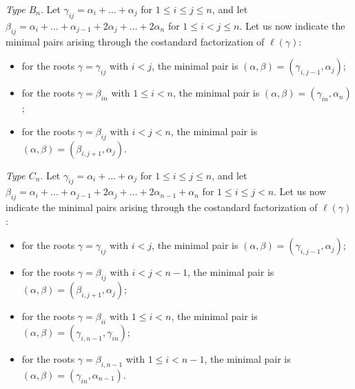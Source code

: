\documentclass[pdftex]{sigma}
\numberwithin{equation}{section}
\begin{document}
\emph{Type $B_n$}.
Let $\gamma_{ij} = \alpha_{i} + \dots + \alpha_{j}$ for $1 \le i \le j \le n$, and let $\beta_{ij} = \alpha_{i} + \dots + \alpha_{j-1} + 2\alpha_{j} + \dots + 2\alpha_{n}$ for $1 \le i < j \le n$. Let us now indicate the minimal pairs arising through the costandard factorization of $\ell(\gamma)$:
\begin{itemize}\itemsep=0pt
\item
for the roots $\gamma=\gamma_{ij}$ with $i < j$, the minimal pair is $(\alpha,\beta)=(\gamma_{i,j - 1},\alpha_{j})$;

\item
for the roots $\gamma=\beta_{in}$ with $1\leq i<n$, the minimal pair is $(\alpha,\beta)=(\gamma_{in},\alpha_{n})$;

\item
for the roots $\gamma=\beta_{ij}$ with $i < j < n$, the minimal pair is $(\alpha,\beta)=(\beta_{i,j + 1},\alpha_{j})$.
\end{itemize}


\emph{Type $C_n$}.
Let $\gamma_{ij} = \alpha_{i} + \dots + \alpha_{j}$ for $1 \le i \le j \le n$, and let $\beta_{ij} = \alpha_{i} + \dots + \alpha_{j - 1} + 2\alpha_{j} + \dots + 2\alpha_{n-1} + \alpha_{n}$ for $1 \le i \le j<n$. Let us now indicate the minimal pairs arising through the costandard factorization of $\ell(\gamma)$:
\begin{itemize}\itemsep=0pt
\item
for the roots $\gamma=\gamma_{ij}$ with $i<j$, the minimal pair is $(\alpha,\beta)=(\gamma_{i,j - 1},\alpha_{j})$;

\item
for the roots $\gamma=\beta_{ij}$ with $i<j<n-1$, the minimal pair is $(\alpha,\beta)=(\beta_{i,j + 1},\alpha_{j})$;

\item
for the roots $\gamma=\beta_{ii}$ with $1\leq i<n$, the minimal pair is $(\alpha,\beta)=(\gamma_{i,n - 1},\gamma_{in})$;

\item for the roots $\gamma=\beta_{i,n-1}$ with $1\leq i<n-1$, the minimal pair is $(\alpha,\beta)=(\gamma_{in},\alpha_{n-1})$.

\end{itemize}
\end{document}
